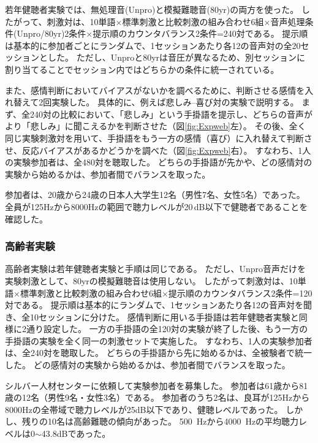 若年健聴者実験では、無処理音(Unpro)と模擬難聴音(80yr)の両方を使った。
したがって、刺激対は、10単語$\times$標準刺激と比較刺激の組み合わせ6組$\times$音声処理条件(Unpro/80yr)2条件$\times$提示順のカウンタバランス2条件=240対である。
提示順は基本的に参加者ごとにランダムで、1セッションあたり各12の音声対の全20セッションとした。
ただし、Unproと80yrは音圧が異なるため、別セッションに割り当てることでセッション内ではどちらかの条件に統一されている。

また、感情判断においてバイアスがないかを調べるために、判断させる感情を入れ替えて2回実験した。
具体的に、例えば悲しみ--喜び対の実験で説明する。
まず、全240対の比較において、「悲しみ」という手掛語を提示し、どちらの音声がより「悲しみ」に聞こえるかを判断させた（図\ref{fig:Expweb}左）。
その後、全く同じ実験刺激対を用いて、手掛語をもう一方の感情（喜び）に入れ替えて判断させ、反応バイアスがあるかどうかを調べた（図\ref{fig:Expweb}右）。
すなわち、1人の実験参加者は、全480対を聴取した。
どちらの手掛語が先かや、どの感情対の実験から始めるかは、参加者間でバランスを取った。

参加者は、20歳から24歳の日本人大学生12名（男性7名、女性5名）であった。
全員が125Hzから8000Hzの範囲で聴力レベルが20\,dB以下で健聴者であることを確認した。


\subsubsection{高齢者実験}

高齢者実験は若年健聴者実験と手順は同じである。
ただし、Unpro音声だけを実験刺激として、80yrの模擬難聴音は使用しない。
したがって刺激対は、10単語$\times$標準刺激と比較刺激の組み合わせ6組$\times$提示順のカウンタバランス2条件=120対である。
提示順は基本的にランダムで、1セッションあたり各12の音声対を聞き、全10セッションに分けた。
感情判断に用いる手掛語は若年健聴者実験と同様に2通り設定した。
一方の手掛語の全120対の実験が終了した後、もう一方の手掛語の実験を全く同一の刺激セットで実施した。
すなわち、1人の実験参加者は、全240対を聴取した。
どちらの手掛語から先に始めるかは、全被験者で統一した。
どの感情対の実験から始めるかは、参加者間でバランスを取った。

シルバー人材センターに依頼して実験参加者を募集した。
参加者は61歳から81歳の12名（男性9名・女性3名）である。
参加者のうち2名は、良耳が125Hzから8000Hzの全帯域で聴力レベルが25dB以下であり、健聴レベルであった。
しかし、残りの10名は高齢難聴の傾向があった。
500~Hzから4000~Hzの平均聴力レベルは0$\sim$43.8dBであった。


